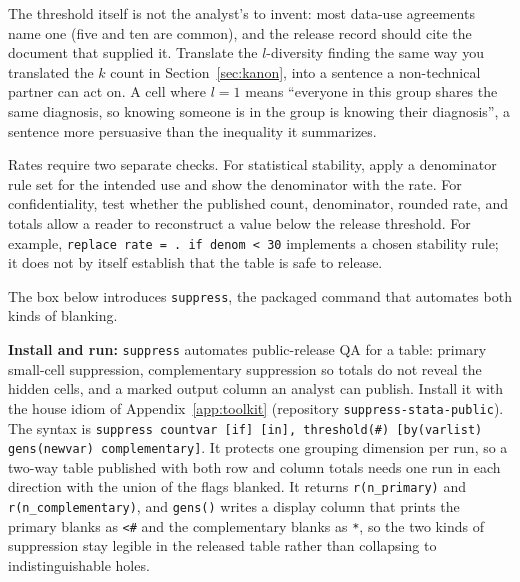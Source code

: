\documentclass[
    a4paper,
    fontsize=10pt,
    twoside=true,
    numbers=noenddot,
]{kaobook}
\begin{document}
The threshold itself is not the analyst's to invent: most data-use agreements name one (five and ten are common), and the release record should cite the document that supplied it. Translate the $l$-diversity finding the same way you translated the $k$ count in Section~\ref{sec:kanon}, into a sentence a non-technical partner can act on. A cell where $l=1$ means \enquote{everyone in this group shares the same diagnosis, so knowing someone is in the group is knowing their diagnosis}, a sentence more persuasive than the inequality it summarizes.

Rates require two separate checks. For statistical stability, apply a denominator rule set for the intended use and show the denominator with the rate. For confidentiality, test whether the published count, denominator, rounded rate, and totals allow a reader to reconstruct a value below the release threshold. For example, \texttt{replace rate = . if denom < 30} implements a chosen stability rule; it does not by itself establish that the table is safe to release.

The box below introduces \texttt{suppress}, the packaged command that automates both kinds of blanking.

\begin{kaobox}[frametitle=Package Integration: \texttt{suppress}]
\textbf{Install and run:} \texttt{suppress} automates public-release QA for a table: primary small-cell suppression, complementary suppression so totals do not reveal the hidden cells, and a marked output column an analyst can publish. Install it with the house idiom of Appendix~\ref{app:toolkit} (repository \texttt{suppress-stata-public}).
The syntax is \texttt{suppress countvar [if] [in], threshold(\#) [by(varlist) gens(newvar) complementary]}. It protects one grouping dimension per run, so a two-way table published with both row and column totals needs one run in each direction with the union of the flags blanked. It returns \texttt{r(n\_primary)} and \texttt{r(n\_complementary)}, and \texttt{gens()} writes a display column that prints the primary blanks as \texttt{<\#} and the complementary blanks as \texttt{*}, so the two kinds of suppression stay legible in the released table rather than collapsing to indistinguishable holes.
\end{kaobox}
\end{document}
